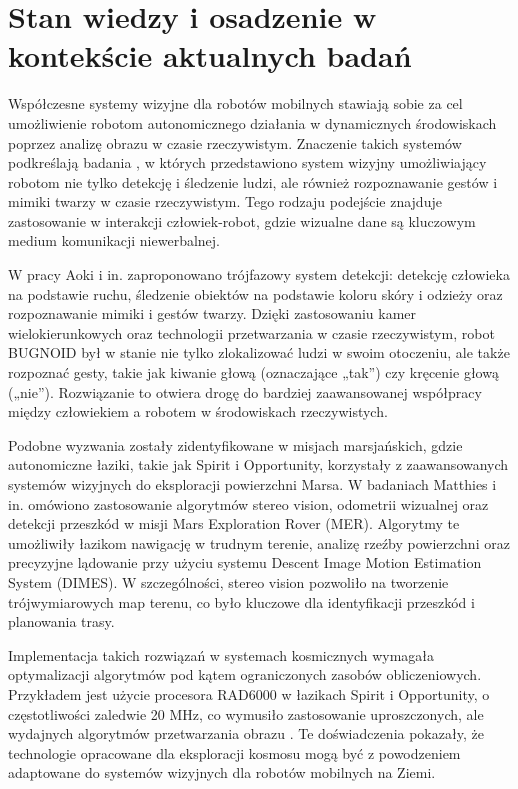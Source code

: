 \documentclass[a4paper,twoside,12pt]{book}
\begin{document}
\section{Stan wiedzy i osadzenie w kontekście aktualnych badań}
Współczesne systemy wizyjne dla robotów mobilnych stawiają sobie za cel umożliwienie robotom autonomicznego działania w dynamicznych środowiskach poprzez analizę obrazu w czasie rzeczywistym. Znaczenie takich systemów podkreślają badania \cite{bib:aoki2001realtime}, w których przedstawiono system wizyjny umożliwiający robotom nie tylko detekcję i śledzenie ludzi, ale również rozpoznawanie gestów i mimiki twarzy w czasie rzeczywistym. Tego rodzaju podejście znajduje zastosowanie w interakcji człowiek-robot, gdzie wizualne dane są kluczowym medium komunikacji niewerbalnej.

W pracy Aoki i in. \cite{bib:aoki2001realtime} zaproponowano trójfazowy system detekcji: detekcję człowieka na podstawie ruchu, śledzenie obiektów na podstawie koloru skóry i odzieży oraz rozpoznawanie mimiki i gestów twarzy. Dzięki zastosowaniu kamer wielokierunkowych oraz technologii przetwarzania w czasie rzeczywistym, robot BUGNOID był w stanie nie tylko zlokalizować ludzi w swoim otoczeniu, ale także rozpoznać gesty, takie jak kiwanie głową (oznaczające „tak”) czy kręcenie głową („nie”). Rozwiązanie to otwiera drogę do bardziej zaawansowanej współpracy między człowiekiem a robotem w środowiskach rzeczywistych.

Podobne wyzwania zostały zidentyfikowane w misjach marsjańskich, gdzie autonomiczne łaziki, takie jak Spirit i Opportunity, korzystały z zaawansowanych systemów wizyjnych do eksploracji powierzchni Marsa. W badaniach Matthies i in. \cite{bib:matthies2007mars} omówiono zastosowanie algorytmów stereo vision, odometrii wizualnej oraz detekcji przeszkód w misji Mars Exploration Rover (MER). Algorytmy te umożliwiły łazikom nawigację w trudnym terenie, analizę rzeźby powierzchni oraz precyzyjne lądowanie przy użyciu systemu Descent Image Motion Estimation System (DIMES). W szczególności, stereo vision pozwoliło na tworzenie trójwymiarowych map terenu, co było kluczowe dla identyfikacji przeszkód i planowania trasy.

Implementacja takich rozwiązań w systemach kosmicznych wymagała optymalizacji algorytmów pod kątem ograniczonych zasobów obliczeniowych. Przykładem jest użycie procesora RAD6000 w łazikach Spirit i Opportunity, o częstotliwości zaledwie 20 MHz, co wymusiło zastosowanie uproszczonych, ale wydajnych algorytmów przetwarzania obrazu \cite{bib:matthies2007mars}. Te doświadczenia pokazały, że technologie opracowane dla eksploracji kosmosu mogą być z powodzeniem adaptowane do systemów wizyjnych dla robotów mobilnych na Ziemi.
\end{document}
